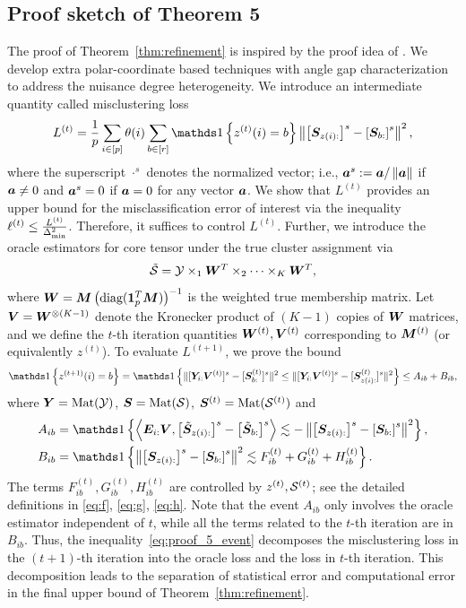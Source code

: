 \documentclass[lettersize,onecolumn,journal]{IEEEtran}
\theoremstyle{definition}
\theoremstyle{definition}
\newcommand{\of}[1]{\left(#1\right)}
\newcommand{\off}[1]{\left[#1\right]}
\newcommand{\offf}[1]{\left\{#1\right\}}
\newcommand{\ang}[1]{\left\langle#1\right\rangle}
\begin{document}
\subsection{Proof sketch of Theorem 5}
The proof of Theorem~\ref{thm:refinement} is inspired by the proof idea of \citet[Theorem 2]{han2020exact}. We develop extra polar-coordinate based techniques with angle gap characterization to address the nuisance degree heterogeneity. We introduce an intermediate quantity called misclustering loss
\begin{equation}
     L^{(t)} = \frac{1}{p}  \sum_{i \in [p]} \theta(i) \sum_{b \in [r]}  \ind \offf{ z^{(t)}(i) = b } \onorm{ \off{ \mS_{ z(i):}  }^s - \off{ \mS_{b:}  }^s  }^2,
\end{equation}
where the superscript $\cdot^{s}$ denotes the normalized vector; i.e., $\bm{a}^s:=\bm{a}/\left\lVert\bm{a}\right\rVert$ if $\bm{a}\neq 0$ and $\bm{a}^{s}=0$ if $\bm{a}=0$ for any vector $\bm{a}$. We show that $L^{(t)}$ provides an upper bound for the misclassification error of interest via the inequality $\ell^{(t)}\leq {L^{(t)}\over \Delta^2_{\min}}$. Therefore, it suffices to control $L^{(t)}$. Further, we introduce the oracle estimators for core tensor under the true cluster assignment via 
\begin{equation}
    \tilde {\mathcal{S}} = \mathcal{Y} \times_1 \bm{W}^T \times_2 \cdots \times_K \bm{W}^T, 
\end{equation}
where $\mW = \mM \of{ \text{diag}(\mone_{p}^T \mM) }^{-1}$ is the weighted true membership matrix. Let $ \bm{V} = \bm{W}^{\otimes (K-1)}$ denote the Kronecker product of $(K-1)$ copies of $\bm{W}$ matrices, and we define the $t$-th iteration quantities $\bm{W}^{(t)}, \bm{V}^{(t)}$ corresponding to $\bm M^{(t)}$ (or equivalently $z^{(t)}$). To evaluate $L^{(t+1)}$, we prove the bound
\begin{equation}\label{eq:proof_5_event}
    \ind \offf{ z^{(t+1)}(i) = b } = \ind \offf{       \onormSize{}{ [ \mY_{i:} \mV^{(t)}  ]^s - [\mS_{b:}^{(t)}]^s }^2 \leq \onormSize{}{ [ \mY_{i:} \mV^{(t)}  ]^s - [\mS_{z(i):}^{(t)}]^s }^2} \leq A_{ib} + B_{ib},
\end{equation}
where $\bm Y = \text{Mat}(\mathcal{Y})$, $ \bm S = \text{Mat}(\mathcal{S})$, $\bm S^{(t)} = \text{Mat}(\mathcal{S}^{(t)})$ and
\begin{align}
        A_{ib} &= \ind \offf{\ang{ \mE_{i:} \mV, \off{  \tilde \mS_{z(i):} }^s - \off{  \tilde \mS_{b:} }^s } \lesssim -  \onorm{ \off{ \mS_{z(i):}  }^s - \off{ \mS_{b:}  }^s  }^2 },\\
        B_{ib} &= \ind \offf{\onorm{ \off{ \mS_{z(i):}  }^s - \off{ \mS_{b:}  }^s  }^2 \lesssim F_{ib}^{(t)} + G_{ib}^{(t)} + H_{ib}^{(t)} }.
\end{align}
The terms $F_{ib}^{(t)}, G_{ib}^{(t)}, H_{ib}^{(t)}$ are controlled by $z^{(t)}, \mathcal{S}^{(t)}$; see the detailed definitions in \eqref{eq:f}, \eqref{eq:g}, \eqref{eq:h}. Note that the event $A_{ib}$ only involves the oracle estimator independent of $t$, while all the terms related to the $t$-th iteration are in $B_{ib}$. Thus, the inequality~\eqref{eq:proof_5_event} decomposes the misclustering loss in the $(t+1)$-th iteration into the oracle loss and the loss in $t$-th iteration. This decomposition leads to the separation of statistical error and computational error in the final upper bound of Theorem~\ref{thm:refinement}.
\end{document}
